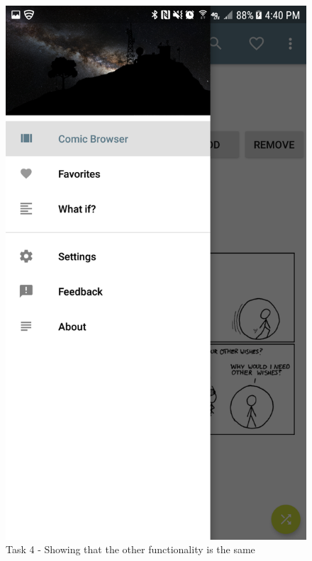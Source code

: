\documentclass{article}
\makeatletter
\def\maxwidth#1{\ifdim\Gin@nat@width>#1 #1\else\Gin@nat@width\fi}
\makeatother
\begin{document}
	\begin{figure}[ht]
		\includegraphics[width=\maxwidth{3in}]{img/t4s4.png}
		\centering
		\caption{Task 4 - Showing that the other functionality is the same}
	\end{figure}
\end{document}
